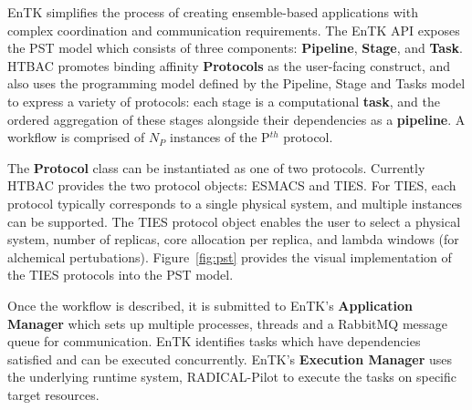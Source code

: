 
EnTK simplifies the process of creating ensemble-based applications with
complex coordination and communication requirements. The EnTK API exposes the
PST model which consists of three components: \textbf{Pipeline},
\textbf{Stage}, and \textbf{Task}. HTBAC promotes binding affinity  {\bf
Protocols} as the user-facing construct, and also uses the programming model
defined by the Pipeline, Stage and Tasks model to express a variety of
protocols: each stage is a computational \textbf{task}, and the
ordered aggregation of these stages alongside their dependencies as a
\textbf{pipeline}. A workflow is comprised of $N_P$ instances of the P$^{th}$
protocol.

The \textbf{Protocol} class can be instantiated as one of two protocols.
Currently HTBAC provides the two protocol objects: ESMACS and TIES. For
TIES, each protocol typically corresponds to a single physical system, and
multiple instances can be supported. The TIES protocol object enables the user
to select a physical system, number of replicas, core allocation per replica,
and lambda windows (for alchemical pertubations). Figure~\ref{fig:pst}
provides the visual implementation of the TIES protocols into the PST model.







  Once the workflow is described, it is submitted to EnTK's
\textbf{Application Manager} which sets up multiple processes, threads and a
RabbitMQ message queue for communication.
EnTK identifies tasks which have dependencies satisfied and can be executed
concurrently. EnTK's \textbf{Execution Manager} uses the underlying runtime
system, RADICAL-Pilot to execute the tasks on specific target resources.


